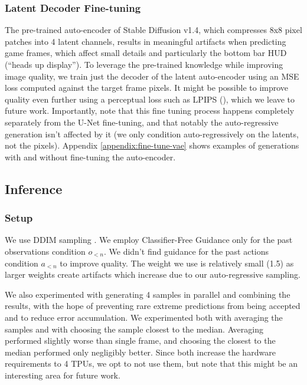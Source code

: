 \documentclass{article} %
\begin{document}
\subsubsection{Latent Decoder Fine-tuning}
\label{sec:autoencoder fine tuning}

The pre-trained auto-encoder of Stable Diffusion v1.4, which compresses 8x8 pixel patches into 4 latent channels, results in meaningful artifacts when predicting game frames, which affect small details and particularly the bottom bar HUD (``heads up display'').
To leverage the pre-trained knowledge while improving image quality, we train just the decoder of the latent auto-encoder using an MSE loss computed against the target frame pixels.
It might be possible to improve quality even further using a perceptual loss such as LPIPS (\cite{zhang2018perceptual}), which we leave to future work.
Importantly, note that this fine tuning process happens completely separately from the U-Net fine-tuning, and that notably the auto-regressive generation isn't affected by it (we only condition auto-regressively on the latents, not the pixels).
Appendix \ref{appendix:fine-tune-vae} shows examples of generations with and without fine-tuning the auto-encoder.

\subsection{Inference}
\label{sec:inference}

\subsubsection{Setup}

We use DDIM sampling \citep{song2022denoisingdiffusionimplicitmodels}.
We employ Classifier-Free Guidance \citep{ho2022classifierfreediffusionguidance} only for the past observations condition $o_{<n}$.
We didn't find guidance for the past actions condition $a_{<n}$ to improve quality. The weight we use is relatively small (1.5) as larger weights create artifacts which increase due to our auto-regressive sampling. 

We also experimented with generating 4 samples in parallel and combining the results, with the hope of preventing rare extreme predictions from being accepted and to reduce error accumulation.
We experimented both with averaging the samples and with choosing the sample closest to the median.
Averaging performed slightly worse than single frame, and choosing the closest to the median performed only negligibly better. Since both increase the hardware requirements to 4 TPUs, we opt to not use them, but note that this might be an interesting area for future work.
\end{document}
